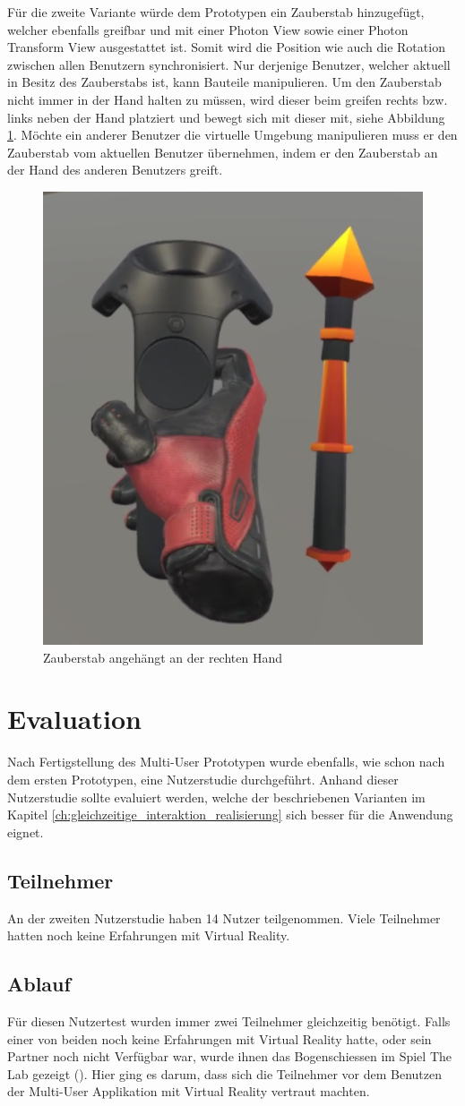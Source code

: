 Für die zweite Variante würde dem Prototypen ein Zauberstab hinzugefügt, welcher ebenfalls greifbar und mit einer Photon View sowie einer Photon Transform View ausgestattet ist. Somit wird die Position wie auch die Rotation zwischen allen Benutzern synchronisiert. Nur derjenige Benutzer, welcher aktuell in Besitz des Zauberstabs ist, kann Bauteile manipulieren. Um den Zauberstab nicht immer in der Hand halten zu müssen, wird dieser beim greifen rechts bzw. links neben der Hand platziert und bewegt sich mit dieser mit, siehe Abbildung \ref{fig:magic_wand}. Möchte ein anderer Benutzer die virtuelle Umgebung manipulieren muss er den Zauberstab vom aktuellen Benutzer übernehmen, indem er den Zauberstab an der Hand des anderen Benutzers greift.

\begin{figure}[h!]
	\centering
	\includegraphics[keepaspectratio,width=0.25\linewidth]{img/MagicWand.PNG}
	\caption{Zauberstab angehängt an der rechten Hand}
	\label{fig:magic_wand}
\end{figure} 

\section{Evaluation}
Nach Fertigstellung des Multi-User Prototypen wurde ebenfalls, wie schon nach dem ersten Prototypen, eine Nutzerstudie durchgeführt. Anhand dieser Nutzerstudie sollte evaluiert werden, welche der beschriebenen Varianten im Kapitel \ref{ch:gleichzeitige_interaktion_realisierung} sich besser für die Anwendung eignet.

\subsection{Teilnehmer}
An der zweiten Nutzerstudie haben 14 Nutzer teilgenommen. Viele Teilnehmer hatten noch keine Erfahrungen mit Virtual Reality.

\subsection{Ablauf}
Für diesen Nutzertest wurden immer zwei Teilnehmer gleichzeitig benötigt. Falls einer von beiden noch keine Erfahrungen mit Virtual Reality hatte, oder sein Partner noch nicht Verfügbar war, wurde ihnen das Bogenschiessen im Spiel \grqq The Lab\grqq{} gezeigt (\cite{noauthor_lab_2019}). Hier ging es darum, dass sich die Teilnehmer vor dem Benutzen der Multi-User Applikation mit Virtual Reality vertraut machten. \\

